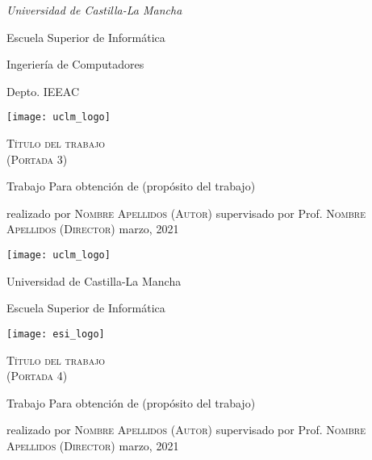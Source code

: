 \documentclass[12pt,a4paper]{report}
\begin{document}
\begin{titlepage}
    \noindent\parbox[c]{.5\linewidth}{
    	\linespread{1.3}
    	\itshape Universidad de Castilla-La Mancha\par
    	Escuela Superior de Informática\par
        Ingeriería de Computadores\par
    	Depto. IEEAC\par
    }%
    \parbox[c]{.5\linewidth}{
    	\hfill\texttt{[image: uclm\_logo]}
    } 
    \centering
    \par\vspace{.15\textheight}
    {\huge\textsc{Título del trabajo \\
     (Portada 3)}\par}
    \Large
    \par\vspace{.1\textheight}
    Trabajo
    \medbreak
    Para obtención de
    (propósito del trabajo)
    \par\vspace{.08\textheight}
    realizado por
    \medbreak
    \textsc{Nombre Apellidos (Autor)}
    \bigbreak
    supervisado por
    \medbreak
    Prof. \textsc{Nombre Apellidos (Director)}
    \vfill
    \noindent%
    \small \hfill marzo, 2021 
\end{titlepage}

\begin{titlepage}
    \centering %
	\texttt{[image: uclm\_logo]}
	\hfill
	\parbox{.5\linewidth}{%
		\centering
		{\LARGE Universidad de Castilla-La Mancha\par}
		\vspace{.05\textheight}
		{\large Escuela Superior de Informática\par}
	}
	\hfill
	\texttt{[image: esi\_logo]}
	\par
    \par\vspace{.15\textheight}
    {\huge\textsc{Título del trabajo \\
     (Portada 4)}\par}
    \Large
    \par\vspace{.1\textheight}
    Trabajo
    \medbreak
    Para obtención de
    (propósito del trabajo)
    \par\vspace{.08\textheight}
    realizado por
    \medbreak
    \textsc{Nombre Apellidos (Autor)}
    \bigbreak
    supervisado por
    \medbreak
    Prof. \textsc{Nombre Apellidos (Director)}
    \vfill
    \noindent%
    \small \hfill marzo, 2021 
\end{titlepage}
\end{document}
